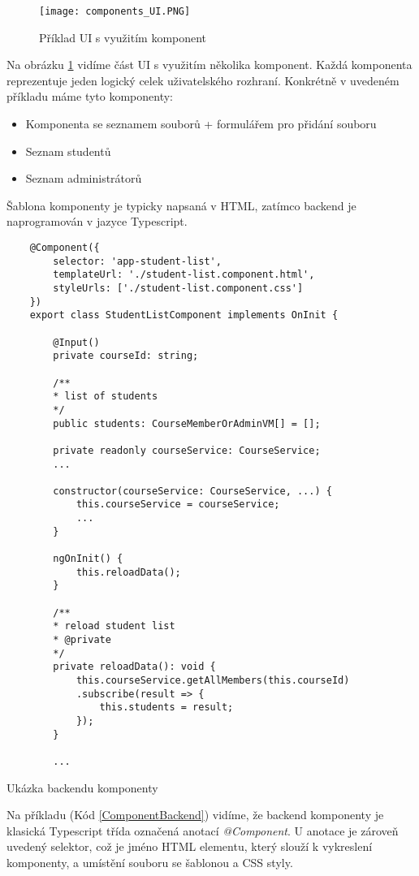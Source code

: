 \begin{figure}
	\centering
	\texttt{[image: components\_UI.PNG]}
	\caption{Příklad UI s využitím komponent}
	\label{fig:Components}
\end{figure}

Na obrázku \ref{fig:Components} vidíme část UI s využitím několika komponent. Každá komponenta reprezentuje jeden logický celek uživatelského rozhraní. Konkrétně v uvedeném příkladu máme tyto komponenty:

\begin{itemize}
	\item Komponenta se seznamem souborů + formulářem pro přidání souboru
	\item Seznam studentů
	\item Seznam administrátorů
\end{itemize}

Šablona komponenty je typicky napsaná v HTML, zatímco backend je naprogramován v jazyce Typescript. 

\lstset{style=typescript}

\begin{program}
	\begin{lstlisting}
	@Component({
		selector: 'app-student-list',
		templateUrl: './student-list.component.html',
		styleUrls: ['./student-list.component.css']
	})
	export class StudentListComponent implements OnInit {
	
		@Input()
		private courseId: string;
		
		/**
		* list of students
		*/
		public students: CourseMemberOrAdminVM[] = [];
		
		private readonly courseService: CourseService;
		...
		
		constructor(courseService: CourseService, ...) {
			this.courseService = courseService;
			...
		}
		
		ngOnInit() {
			this.reloadData();
		}
		
		/**
		* reload student list
		* @private
		*/
		private reloadData(): void {
			this.courseService.getAllMembers(this.courseId)
			.subscribe(result => {
				this.students = result;
			});
		}
		
		...
	\end{lstlisting}
	\caption{Ukázka backendu komponenty}
	\label{ComponentBackend}
\end{program}

Na příkladu (Kód \ref{ComponentBackend}) vidíme, že backend komponenty je klasická Typescript třída označená anotací \textit{@Component}. U anotace je zároveň uvedený selektor, což je jméno HTML elementu, který slouží k vykreslení komponenty, a umístění souboru se šablonou a CSS styly.

